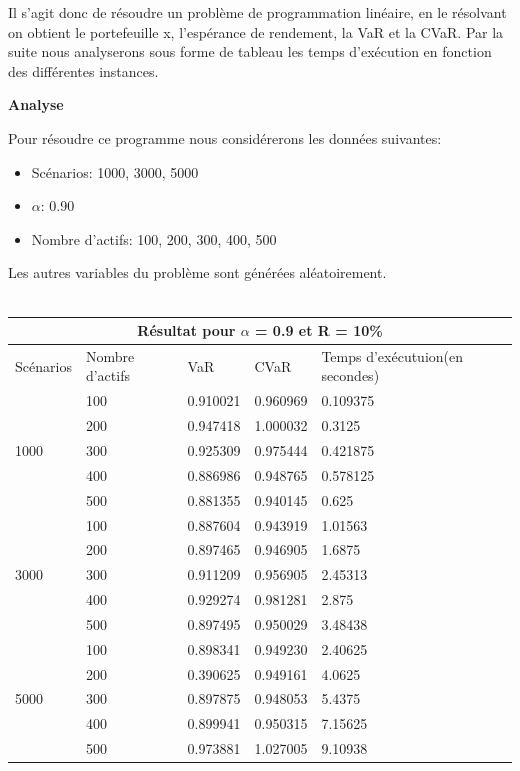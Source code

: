\documentclass[12pt]{article}
\theoremstyle{definition}
\theoremstyle{definition}
\begin{document}
Il s'agit donc de résoudre un problème de programmation linéaire, en le résolvant on obtient le portefeuille x, l’espérance de rendement, la VaR et la CVaR. Par la suite nous analyserons sous forme de tableau les temps d'exécution en fonction des différentes instances.
\newline
\begin{center}
        \textbf{Analyse}
\end{center}

Pour résoudre ce programme nous considérerons les données suivantes:
\begin{itemize}
\item Scénarios: 1000, 3000, 5000
\item $\alpha$: 0.90
\item Nombre d'actifs: 100, 200, 300, 400, 500
\end{itemize}
Les autres variables du problème sont générées aléatoirement.\\ \\
\begin{tabular}{|l|l|l|l|l|}
  \hline
  \multicolumn{5}{|c|}{Résultat pour \textbf{$\alpha$ = 0.9} et \textbf{R = 10\%}} \\
  \hline
  Scénarios & Nombre d'actifs & VaR & CVaR & Temps d'exécutuion(en secondes)\\ \hline
  \multirow{5}{*}{1000} & 100 & 0.910021 & 0.960969 & 0.109375\\
    & 200 & 0.947418 & 1.000032 & 0.3125\\
    & 300 & 0.925309 & 0.975444 & 0.421875\\
    & 400 & 0.886986 & 0.948765 & 0.578125\\ 
    & 500 & 0.881355 & 0.940145 & 0.625\\ \hline
  \multirow{5}{*}{3000} & 100 & 0.887604 & 0.943919 & 1.01563\\
    & 200 & 0.897465 & 0.946905 & 1.6875\\
    & 300 & 0.911209 & 0.956905 & 2.45313\\
    & 400 & 0.929274 & 0.981281 & 2.875\\ 
    & 500 & 0.897495 & 0.950029 & 3.48438\\ \hline
  \multirow{5}{*}{5000} & 100 & 0.898341 & 0.949230 & 2.40625\\
    & 200 & 0.390625 & 0.949161 & 4.0625\\
    & 300 & 0.897875 & 0.948053 & 5.4375\\
    & 400 & 0.899941 & 0.950315 & 7.15625\\ 
    & 500 & 0.973881 & 1.027005 & 9.10938\\ \hline
\end{tabular} \\ \\
\end{document}
